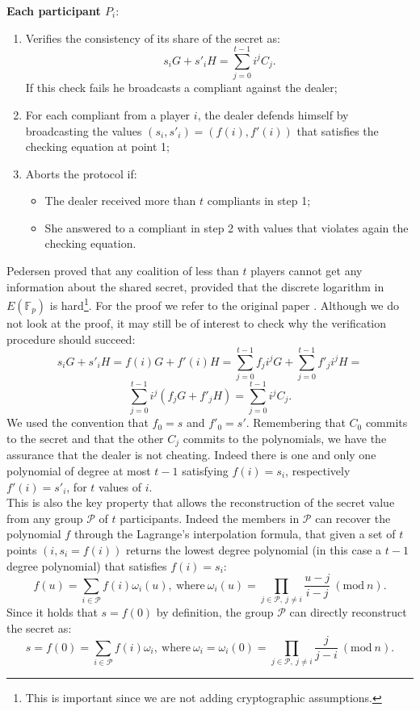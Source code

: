 \noindent
{\bf Each participant $P_i$}:
\begin{enumerate}
	\item Verifies the consistency of its share of the secret as:
	$$s_iG + s'_iH = \sum_{j = 0}^{t - 1}i^jC_j.$$
	If this check fails he broadcasts a compliant against the dealer;
	\item For each compliant from a player $i$, the dealer defends himself by broadcasting the values $(s_i, s'_i) = (f(i), f'(i))$ that satisfies the checking equation at point 1;
	\item Aborts the protocol if:
	\begin{itemize}
		\item The dealer received more than $t$ compliants in step 1;
		\item She answered to a compliant in step 2 with values that violates again the checking equation.
	\end{itemize}
\end{enumerate}
Pedersen proved that any coalition of less than $t$ players cannot get any information about the shared secret, provided that the discrete logarithm in $E(\mathbb{F}_p)$ is hard\footnote{This is important since we are not adding cryptographic assumptions.}. For the proof we refer to the original paper \cite{RefWork:13}. Although we do not look at the proof, it may still be of interest to check why the verification procedure should succeed:
$$s_iG+ s'_iH = f(i)G + f'(i)H = \sum_{j = 0}^{t- 1}f_ji^jG + \sum_{j = 0}^{t - 1}f'_ji^jH =$$
$$ \sum_{j = 0}^{t - 1}i^j(f_jG + f'_jH)= \sum_{j = 0}^{t - 1}i^jC_j.$$
We used the convention that $f_0 = s$ and $f'_0 = s'$. Remembering that $C_0$ commits to the secret and that the other $C_j$ commits to the polynomials, we have the assurance that the dealer is not cheating. Indeed there is one and only one polynomial of degree at most $t - 1$ satisfying $f(i) = s_i$, respectively $f'(i) = s'_i$, for $t$ values of $i$. 
\\
This is also the key property that allows the reconstruction of the secret value from any group $\mathcal{P}$ of $t$ participants. Indeed the members in $\mathcal{P}$ can recover the polynomial $f$ through the Lagrange's interpolation formula, that given a set of $t$ points $(i, s_i = f(i))$ returns the lowest degree polynomial (in this case a $t - 1$ degree polynomial) that satisfies $f(i) = s_i$:
$$f(u) = \sum_{i \in \mathcal{P}}f(i)\omega_i(u), \ \text{where} \ \omega_i(u) = \prod_{j \in \mathcal{P}, \ j \neq i}\frac{u - j}{i - j} \ (\text{mod} \ n).$$
Since it holds that $s = f(0)$ by definition, the group $\mathcal{P}$ can directly reconstruct the secret as:
$$s = f(0) = \sum_{i \in \mathcal{P}}f(i)\omega_i,  \ \text{where} \ \omega_i = \omega_i(0) = \prod_{j \in \mathcal{P}, \ j \neq i}\frac{j}{j - i} \ (\text{mod} \ n).$$

